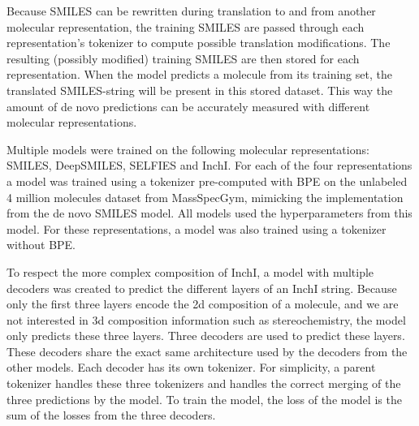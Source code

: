Because SMILES can be rewritten during translation to and from another molecular representation,
the training SMILES are passed through each representation's tokenizer to compute possible translation modifications.
The resulting (possibly modified) training SMILES are then stored for each representation.
When the model predicts a molecule from its training set, the translated SMILES-string will be present in this stored dataset.
This way the amount of de novo predictions can be accurately measured with different molecular representations.

Multiple models were trained on the following molecular representations: SMILES, DeepSMILES, SELFIES and InchI.
For each of the four representations a model was trained using a tokenizer pre-computed with \ac{BPE} on the unlabeled 4 million molecules dataset from MassSpecGym,
mimicking the implementation from the de novo SMILES model. All models used the hyperparameters from this model.
For these representations, a model was also trained using a tokenizer without \ac{BPE}.

To respect the more complex composition of InchI, a model with multiple decoders was created to predict the different layers of an InchI string.
Because only the first three layers encode the 2d composition of a molecule, and we are not interested in 3d composition information such as stereochemistry,
the model only predicts these three layers.
Three decoders are used to predict these layers. These decoders share the exact same architecture used by the decoders from the other models.
Each decoder has its own tokenizer. For simplicity, a parent tokenizer handles these three tokenizers and handles the correct merging of the three predictions by the model.
To train the model, the loss of the model is the sum of the losses from the three decoders.
